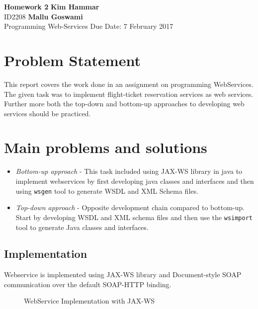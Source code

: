 \documentclass[a4paper, 11pt]{article}
\begin{document}
\noindent
\large\textbf{Homework 2} \hfill \textbf{Kim Hammar} \\
\normalsize ID2208 \hfill  \textbf{Mallu Goswami} \\
Programming Web-Services \hfill Due Date: 7 February 2017\\

\section*{Problem Statement}
This report covers the work done in an assignment on programming WebServices. The given task was to implement flight-ticket reservation services as web services. Further more both the top-down and bottom-up approaches to developing web services should be practiced.
\section*{Main problems and solutions}
\begin{itemize}
\item \textit{Bottom-up approach} - This task included using JAX-WS library \citep{jax_ws} in java to implement webservices by first developing java classes and interfaces and then using \texttt{wsgen} tool to generate WSDL and XML Schema files.
\item \textit{Top-down approach} - Opposite development chain compared to bottom-up. Start by developing WSDL and XML schema files and then use the \texttt{wsimport} tool to generate Java classes and interfaces.  
\end{itemize}
\subsection*{Implementation}
Webservice is implemented using JAX-WS library and Document-style SOAP communication over the default SOAP-HTTP binding.
\begin{figure}[H]
  \begin{center}
    \caption{WebService Implementation with JAX-WS}
    \label{fig:fig}
  \end{center}
\end{figure}
\end{document}
